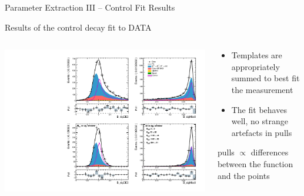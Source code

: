 \documentclass[serif]{beamer}
\begin{document}
\begin{frame}[t]{Parameter Extraction III -- Control Fit Results}
\vspace{-3mm}
\small

Results of the control decay fit to DATA

\begin{columns}
	\vspace{-2mm}
	\begin{center}
		\includegraphics[width=\textwidth]{fig/cs_fit_data}
	\end{center}
	
	\begin{block}{}
		\begin{itemize}
			\item Templates are appropriately summed to best fit the measurement
			\item The fit behaves well, no strange artefacts in pulls 
		\end{itemize}
	{\tiny pulls $\propto$ differences between the function and the points}
	\end{block}
\end{columns}


\end{frame}

\end{document}
